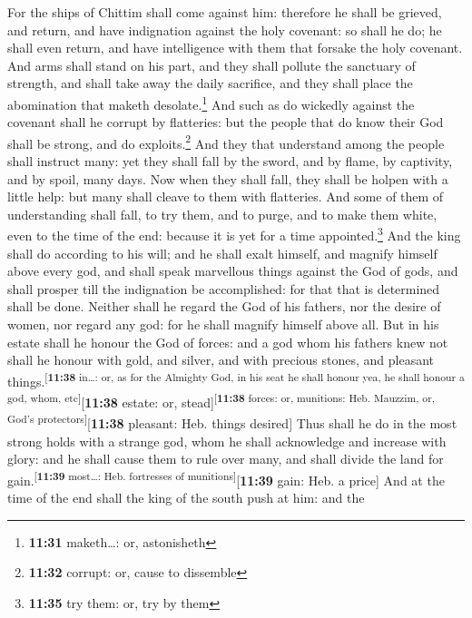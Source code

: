  For the ships of Chittim shall come against him:
therefore he shall be grieved, and return, and have indignation against
the holy covenant: so shall he do; he shall even return, and have
intelligence with them that forsake the holy covenant. 
And arms shall stand on his part, and they shall pollute the sanctuary
of strength, and shall take away the daily sacrifice, and they shall
place the abomination that maketh desolate.\footnote{\textbf{11:31}
  maketh\ldots: or, astonisheth}  And such as do wickedly
against the covenant shall he corrupt by flatteries: but the people that
do know their God shall be strong, and do exploits.\footnote{\textbf{11:32}
  corrupt: or, cause to dissemble}  And they that
understand among the people shall instruct many: yet they shall fall by
the sword, and by flame, by captivity, and by spoil, many days.
 Now when they shall fall, they shall be holpen with a
little help: but many shall cleave to them with flatteries.
 And some of them of understanding shall fall, to try
them, and to purge, and to make them white, even to the time of the end:
because it is yet for a time appointed.\footnote{\textbf{11:35} try
  them: or, try by them}  And the king shall do according
to his will; and he shall exalt himself, and magnify himself above every
god, and shall speak marvellous things against the God of gods, and
shall prosper till the indignation be accomplished: for that that is
determined shall be done.  Neither shall he regard the
God of his fathers, nor the desire of women, nor regard any god: for he
shall magnify himself above all.  But in his estate shall
he honour the God of forces: and a god whom his fathers knew not shall
he honour with gold, and silver, and with precious stones, and pleasant
things.\textsuperscript{{[}\textbf{11:38} in\ldots: or, as for the
Almighty God, in his seat he shall honour yea, he shall honour a god,
whom, etc{]}}{[}\textbf{11:38} estate: or,
stead{]}\textsuperscript{{[}\textbf{11:38} forces: or, munitions: Heb.
Mauzzim, or, God's protectors{]}}{[}\textbf{11:38} pleasant: Heb. things
desired{]}  Thus shall he do in the most strong holds
with a strange god, whom he shall acknowledge and increase with glory:
and he shall cause them to rule over many, and shall divide the land for
gain.\textsuperscript{{[}\textbf{11:39} most\ldots: Heb. fortresses of
munitions{]}}{[}\textbf{11:39} gain: Heb. a price{]}  And
at the time of the end shall the king of the south push at him: and the
